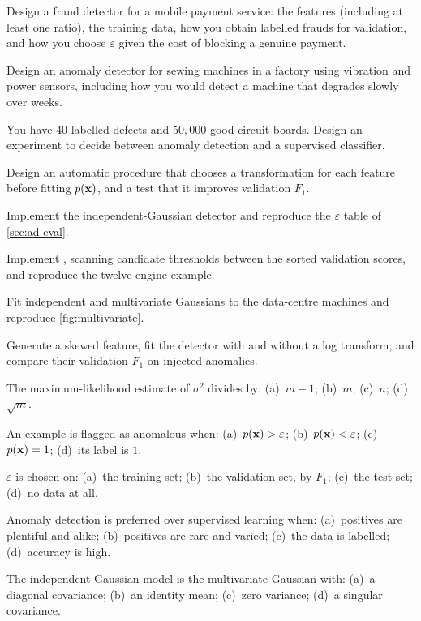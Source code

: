 
\dpr Design a fraud detector for a mobile payment service: the features
(including at least one ratio), the training data, how you obtain labelled frauds
for validation, and how you choose $\varepsilon$ given the cost of blocking a
genuine payment.

\dpr Design an anomaly detector for sewing machines in a factory using vibration
and power sensors, including how you would detect a machine that degrades slowly
over weeks.

\dpr You have $40$ labelled defects and $50{,}000$ good circuit boards. Design an
experiment to decide between anomaly detection and a supervised classifier.

\dpr Design an automatic procedure that chooses a transformation for each
feature before fitting $p(\mathbf{x})$, and a test that it improves validation $F_1$.


\pe Implement the independent-Gaussian detector and reproduce the
$\varepsilon$ table of \cref{sec:ad-eval}.

\pe Implement , scanning candidate thresholds between the
sorted validation scores, and reproduce the twelve-engine example.

\pe Fit independent and multivariate Gaussians to the data-centre machines and
reproduce \cref{fig:multivariate}.

\pe Generate a skewed feature, fit the detector with and without a log transform,
and compare their validation $F_1$ on injected anomalies.


\qz The maximum-likelihood estimate of $\sigma^2$ divides by: (a)~$m-1$;
(b)~$m$; (c)~$n$; (d)~$\sqrt m$.

\qz An example is flagged as anomalous when: (a)~$p(\mathbf{x}) > \varepsilon$;
(b)~$p(\mathbf{x}) < \varepsilon$; (c)~$p(\mathbf{x}) = 1$; (d)~its label is $1$.

\qz $\varepsilon$ is chosen on: (a)~the training set; (b)~the validation set,
by $F_1$; (c)~the test set; (d)~no data at all.

\qz Anomaly detection is preferred over supervised learning when: (a)~positives
are plentiful and alike; (b)~positives are rare and varied; (c)~the data is
labelled; (d)~accuracy is high.

\qz The independent-Gaussian model is the multivariate Gaussian with:
(a)~a diagonal covariance; (b)~an identity mean; (c)~zero variance; (d)~a singular
covariance.

